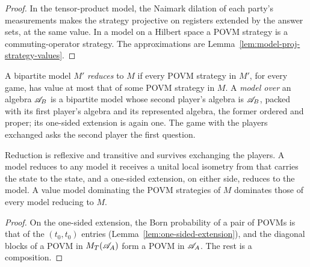 \begin{proof}
\leanok
In the tensor-product model, the Naimark dilation of each party's measurements makes the strategy
projective on registers extended by the answer sets, at the same value. In a model on a Hilbert
space a POVM strategy is a commuting-operator strategy. The approximations are
Lemma~\ref{lem:model-proj-strategy-values}.
\end{proof}

\begin{definition}
\label{def:povm-reduction}
\leanok
A bipartite model $M'$ \emph{reduces} to $M$ if every POVM strategy in $M'$, for every game, has
value at most that of some POVM strategy in $M$. A \emph{model over} an algebra $\mathscr{A}_B$ is a
bipartite model whose second player's algebra is $\mathscr{A}_B$, packed with its first player's algebra
and its represented algebra, the former ordered and proper; its one-sided extension is again one.
The game with the players exchanged asks the second player the first question.
\end{definition}

\begin{lemma}[Reductions]
\label{lem:povm-reduction}
\leanok
Reduction is reflexive and transitive and survives exchanging the players. A model reduces to any
model it receives a unital local isometry from that carries the state to the state, and a one-sided
extension, on either side, reduces to the model. A value model dominating the POVM strategies of
$M$ dominates those of every model reducing to $M$.
\end{lemma}

\begin{proof}
\leanok
On the one-sided extension, the Born probability of a pair of POVMs is that of the $(t_0, t_0)$
entries (Lemma~\ref{lem:one-sided-extension}), and the diagonal blocks of a POVM in $M_T(\mathscr{A}_A)$
form a POVM in $\mathscr{A}_A$. The rest is a composition.
\end{proof}

